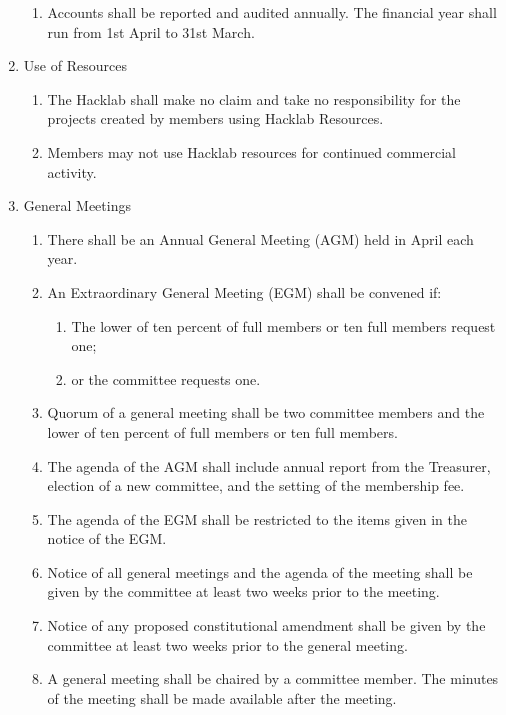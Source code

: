 \documentclass{article}
\begin{document}
\begin{enumerate}
\begin{enumerate}
    \item Accounts shall be reported and audited annually. The
      financial year shall run from 1st April to 31st March.
    \end{enumerate}
    \item Use of Resources
      \begin{enumerate}
      \item The Hacklab shall make no claim and take no responsibility
        for the projects created by members using Hacklab Resources.
      \item Members may not use Hacklab resources for continued
        commercial activity.
      \end{enumerate}
    \item General Meetings
      \begin{enumerate}
      \item There shall be an Annual General Meeting (AGM) held in
        April each year.
      \item An Extraordinary General Meeting (EGM) shall be convened if:
        \begin{enumerate}
        \item The lower of ten percent of full members or ten full
          members request one;
        \item or the committee requests one.
        \end{enumerate}
      \item Quorum of a general meeting shall be two committee members
        and the lower of ten percent of full members or ten full
        members.
      \item The agenda of the AGM shall include annual report from the
        Treasurer, election of a new committee, and the setting of the
        membership fee.
      \item The agenda of the EGM shall be restricted to the items
        given in the notice of the EGM.
      \item Notice of all general meetings and the agenda of the
        meeting shall be given by the committee at least two weeks
        prior to the meeting.
      \item Notice of any proposed constitutional amendment shall be
        given by the committee at least two weeks prior to the general
        meeting.
      \item A general meeting shall be chaired by a committee
        member. The minutes of the meeting shall be made available
        after the meeting.

\end{enumerate}
\end{enumerate}
\end{document}
